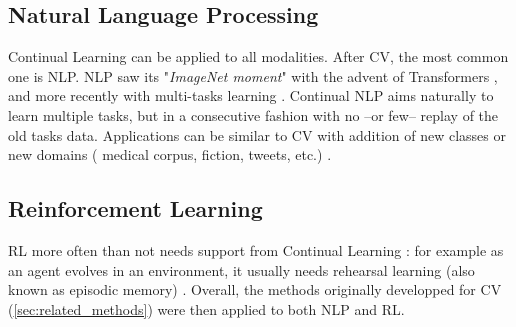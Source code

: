 \subsection{Natural Language Processing}
\label{sec:related_nlp}


Continual Learning can be applied to all modalities. After \acf{CV}, the most common one is
\ac{NLP}. \ac{NLP} saw its "\textit{ImageNet moment}" with the advent of Transformers
\citep{vaswani2017transformer}, and more recently with multi-tasks learning \citep{raffel2019t5}.
Continual \ac{NLP} \cite{biesialska2020continualnlp} aims naturally to learn multiple tasks, but in
a consecutive fashion with no --or few-- replay of the old tasks data. Applications can be similar
to \ac{CV} with addition of new classes \citep{masson2019episodiclifelongnlp} or new domains (\eg
medical corpus, fiction, tweets, etc.) \citep{gerald2021continualri}.

\subsection{Reinforcement Learning}
\label{sec:related_rl}


\ac{RL} \citep{sutton1998rl} more often than not needs support from Continual
Learning \citep{khetarpal2020continualrl}: for example as an agent evolves in an environment, it
usually needs rehearsal learning (also known as episodic memory) \citep{mnih2013atarirl}. Overall,
the methods originally developped for \ac{CV} (\autoref{sec:related_methods}) were then applied to
both \ac{NLP} and \ac{RL}.
